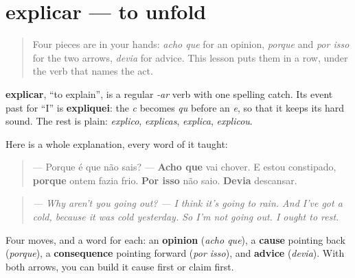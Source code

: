 \section[explicar]{explicar — to unfold}

\label{lesson:PT-C262-explicar}



\begin{quote}
Four pieces are in your hands: \emph{acho que} for an opinion, \emph{porque} and \emph{por isso} for the two arrows, \emph{devia} for advice. This lesson puts them in a row, under the verb that names the act.
\end{quote}

\begin{grammarlens}[title={Grammar Lens: the shape of an explanation}]
\textbf{explicar}, \textquotedblleft{}to explain\textquotedblright{}, is a regular \emph{-ar} verb with one spelling catch. Its event past for \textquotedblleft{}I\textquotedblright{} is \textbf{expliquei}: the \emph{c} becomes \emph{qu} before an \emph{e}, so that it keeps its hard sound. The rest is plain: \emph{explico}, \emph{explicas}, \emph{explica}, \emph{explicou}.

Here is a whole explanation, every word of it taught:

\begin{quote}
— Porque é que não sais? — \textbf{Acho que} vai chover. E estou constipado, \textbf{porque} ontem fazia frio. \textbf{Por isso} não saio. \textbf{Devia} descansar.
\end{quote}

\begin{quote}
\emph{— Why aren't you going out?} \emph{— I think it's going to rain. And I've got a cold, because it was cold yesterday. So I'm not going out. I ought to rest.}
\end{quote}

Four moves, and a word for each: an \textbf{opinion} (\emph{acho que}), a \textbf{cause} pointing back (\emph{porque}), a \textbf{consequence} pointing forward (\emph{por isso}), and \textbf{advice} (\emph{devia}). With both arrows, you can build it cause first or claim first.
\end{grammarlens}

